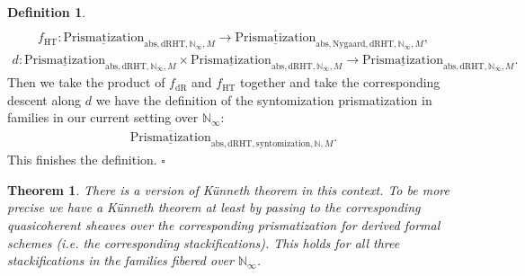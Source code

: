 \documentclass[12pt]{article}
\newtheorem{theorem}{Theorem}
\theoremstyle{definition}
\newtheorem{definition}{Definition}
\begin{document}
\begin{definition}
\begin{align}
\end{align}
\begin{align}
f_\mathrm{HT}: {\underline{\mathrm{Prismatization}}}_{\mathrm{abs},\mathrm{dRHT},\mathbb{N}_\infty,M}\rightarrow \overline{\underline{\mathrm{Prismatization}}}_{\mathrm{abs},\mathrm{Nygaard},\mathrm{dRHT},\mathbb{N}_\infty,M},
\end{align}
\begin{align}
d:  {\underline{\mathrm{Prismatization}}}_{\mathrm{abs},\mathrm{dRHT},\mathbb{N}_\infty,M}\times {\underline{\mathrm{Prismatization}}}_{\mathrm{abs},\mathrm{dRHT},\mathbb{N}_\infty,M} \rightarrow {\underline{\mathrm{Prismatization}}}_{\mathrm{abs},\mathrm{dRHT},\mathbb{N}_\infty,M}.
\end{align}
Then we take the product of $f_\mathrm{dR}$ and $f_\mathrm{HT}$ together and take the corresponding descent along $d$ we have the definition of the syntomization prismatization in families in our current setting over $\mathbb{N}_\infty$:
\begin{align}
\overline{\underline{\mathrm{Prismatization}}}_{\mathrm{abs},\mathrm{dRHT},\mathrm{syntomization},\mathbb{N},M}. 
\end{align}
This finishes the definition. $\square$
\end{definition}

\begin{theorem}
There is a version of K\"unneth theorem in this context. To be more precise we have a K\"unneth theorem at least by passing to the corresponding quasicoherent sheaves over the corresponding prismatization for derived formal schemes (i.e. the corresponding stackifications). This holds for all three stackifications in the families fibered over $\mathbb{N}_\infty$. 
\end{theorem}
\end{document}
